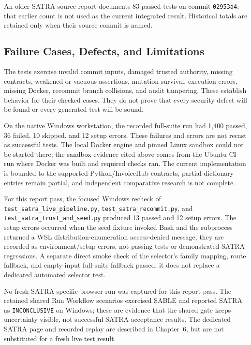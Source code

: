 An older SATRA source report documents 83 passed tests on commit \texttt{02953a4}; that earlier count is not used as the current integrated result. Historical totals are retained only when their source commit is named.

\subsection{Failure Cases, Defects, and Limitations}
The tests exercise invalid commit inputs, damaged trusted authority, missing contracts, weakened or vacuous assertions, mutation survival, execution errors, missing Docker, recommit branch collisions, and audit tampering. These establish behavior for their checked cases. They do not prove that every security defect will be found or every generated test will be sound.

On the native Windows workstation, the recorded full-suite run had 1,400 passed, 36 failed, 10 skipped, and 12 setup errors. These failures and errors are not recast as successful tests. The local Docker engine and pinned Linux sandbox could not be started there; the sandbox evidence cited above comes from the Ubuntu CI run where Docker was built and required checks ran. The current implementation is bounded to the supported Python/InvoiceHub contracts, partial dictionary entries remain partial, and independent comparative research is not complete.

For this report pass, the focused Windows recheck of \texttt{test\_satra\_live\_pipeline.py}, \texttt{test\_satra\_recommit.py}, and \texttt{test\_satra\_trust\_and\_seed.py} produced 13 passed and 12 setup errors. The setup errors occurred when the seed fixture invoked Bash and the subprocess returned a WSL distribution-enumeration access-denied message; they are recorded as environment/setup errors, not passing tests or demonstrated SATRA regressions. A separate direct smoke check of the selector's family mapping, route fallback, and empty-input full-suite fallback passed; it does not replace a dedicated automated selector test.

No fresh SATRA-specific browser run was captured for this report pass. The retained shared Run Workflow scenarios exercised SABLE and reported SATRA as \texttt{INCONCLUSIVE} on Windows; these are evidence that the shared gate keeps uncertainty visible, not successful SATRA acceptance results. The dedicated SATRA page and recorded replay are described in Chapter~6, but are not substituted for a fresh live test result.

